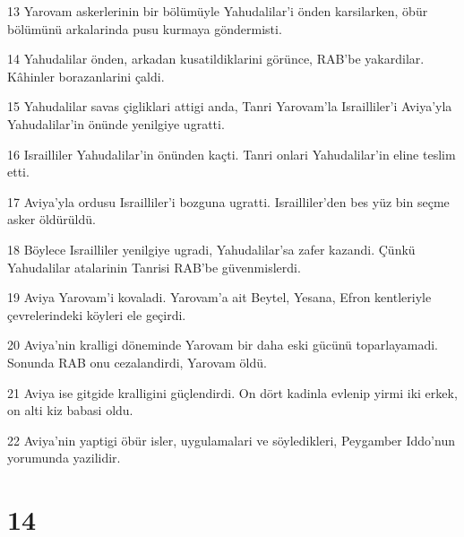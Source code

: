 \par 13 Yarovam askerlerinin bir bölümüyle Yahudalilar'i önden karsilarken, öbür bölümünü arkalarinda pusu kurmaya göndermisti.
\par 14 Yahudalilar önden, arkadan kusatildiklarini görünce, RAB'be yakardilar. Kâhinler borazanlarini çaldi.
\par 15 Yahudalilar savas çigliklari attigi anda, Tanri Yarovam'la Israilliler'i Aviya'yla Yahudalilar'in önünde yenilgiye ugratti.
\par 16 Israilliler Yahudalilar'in önünden kaçti. Tanri onlari Yahudalilar'in eline teslim etti.
\par 17 Aviya'yla ordusu Israilliler'i bozguna ugratti. Israilliler'den bes yüz bin seçme asker öldürüldü.
\par 18 Böylece Israilliler yenilgiye ugradi, Yahudalilar'sa zafer kazandi. Çünkü Yahudalilar atalarinin Tanrisi RAB'be güvenmislerdi.
\par 19 Aviya Yarovam'i kovaladi. Yarovam'a ait Beytel, Yesana, Efron kentleriyle çevrelerindeki köyleri ele geçirdi.
\par 20 Aviya'nin kralligi döneminde Yarovam bir daha eski gücünü toparlayamadi. Sonunda RAB onu cezalandirdi, Yarovam öldü.
\par 21 Aviya ise gitgide kralligini güçlendirdi. On dört kadinla evlenip yirmi iki erkek, on alti kiz babasi oldu.
\par 22 Aviya'nin yaptigi öbür isler, uygulamalari ve söyledikleri, Peygamber Iddo'nun yorumunda yazilidir.

\chapter{14}

